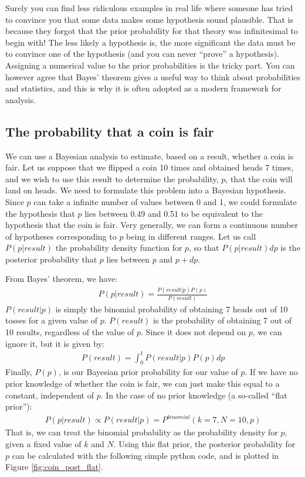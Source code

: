 Surely you can find less ridiculous examples in real life where someone has tried to convince you that some data makes some hypothesis sound plausible. That is because they forgot that the prior probability for that theory was infinitesimal to begin with! The less likely a hypothesis is, the more significant the data must be to convince one of the hypothesis (and you can never ``prove'' a hypothesis). Assigning a numerical value to the prior probabilities is the tricky part. You can however agree that Bayes' theorem  gives a useful way to think about probabilities and statistics, and this is why it is often adopted as a modern framework for analysis.

\subsection{The probability that a coin is fair}
We can use a Bayesian analysis to estimate, based on a result, whether a coin is fair. Let us suppose that we flipped a coin 10 times and obtained heads 7 times, and we wish to use this result to determine the probability, $p$, that the coin will land on heads. We need to formulate this problem into a Bayesian hypothesis. Since $p$ can take a infinite number of values between 0 and 1, we could formulate the hypothesis that $p$ lies between 0.49 and 0.51 to be equivalent to the hypothesis that the coin is fair. Very generally, we can form a continuous number of hypotheses corresponding to $p$ being in different ranges. Let us call $P(p|result)$ the probability density function for $p$, so that $P(p|result)dp$ is the posterior probability that $p$ lies between $p$ and $p+dp$.

From Bayes' theorem, we have:
\begin{align*}
P(p|result)=\frac{P(result|p)P(p)}{P(result)}
\end{align*}
$P(result|p)$ is simply the binomial probability of obtaining 7 heads out of 10 tosses for a given value of $p$. $P(result)$ is the probability of obtaining 7 out of 10 results, regardless of the value of $p$. Since it does not depend on $p$, we can ignore it, but it is given by:
\begin{align*}
P(result) = \int_0^1P(result|p)P(p)dp
\end{align*}
Finally, $P(p)$, is our Bayesian prior probability for our value of $p$. If we have no prior knowledge of whether the coin is fair, we can just make this equal to a constant, independent of $p$. In the case of no prior knowledge (a so-called ``flat prior''):
\begin{align*}
P(p|result)\propto P(result|p)=P^{binomial}(k=7,N=10,p)
\end{align*}
That is, we can treat the binomial probability as the probability density for $p$, given a fixed value of $k$ and $N$. Using this flat prior, the posterior probability for $p$ can be calculated with the following simple python code, and is plotted in Figure \ref{fig:coin_post_flat}.

